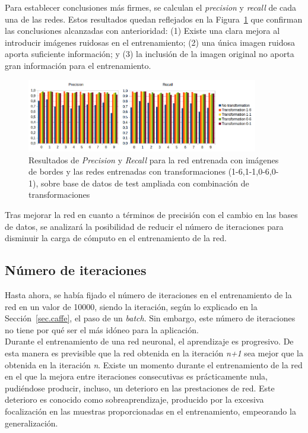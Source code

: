 Para establecer conclusiones más firmes, se calculan el \textit{precision} y \textit{recall} de cada una de las redes. Estos resultados quedan reflejados en la Figura~\ref{fig.precision-recall} que confirman las conclusiones alcanzadas con anterioridad: (1) Existe una clara mejora al introducir imágenes ruidosas en el entrenamiento; (2) una única imagen ruidosa aporta suficiente información; y (3) la inclusión de la imagen original no aporta gran información para el entrenamiento.\\
\begin{figure}[H]
	\centering
	\includegraphics[width=0.9\textwidth]{figures/precision-recall}
	\caption{Resultados de \textit{Precision} y \textit{Recall} para la red entrenada con imágenes de bordes y las redes entrenadas con transformaciones (1-6,1-1,0-6,0-1), sobre base de datos de test ampliada con combinación de transformaciones}
	\label{fig.precision-recall}
\end{figure}


Tras mejorar la red en cuanto a términos de precisión con el cambio en las bases de datos, se analizará la posibilidad de reducir el número de iteraciones para disminuir la carga de cómputo en el entrenamiento de la red.

\subsection{Número de iteraciones}
Hasta ahora, se había fijado el número de iteraciones en el entrenamiento de la red en un valor de 10000, siendo la iteración, según lo explicado en la Sección~\ref{sec.caffe}, el paso de un \textit{batch}. Sin embargo, este número de iteraciones no tiene por qué ser el más idóneo para la aplicación.\\

Durante el entrenamiento de una red neuronal, el aprendizaje es progresivo. De esta manera es previsible que la red obtenida en la iteración \textit{n+1} sea mejor que la obtenida en la iteración \textit{n}. Existe un momento durante el entrenamiento de la red en el que la mejora entre iteraciones consecutivas es prácticamente nula, pudiéndose producir, incluso, un deterioro en las prestaciones de red. Este deterioro es conocido como sobreaprendizaje, producido por la excesiva focalización en las muestras proporcionadas en el entrenamiento, empeorando la generalización.\\
\vspace{10pt}

